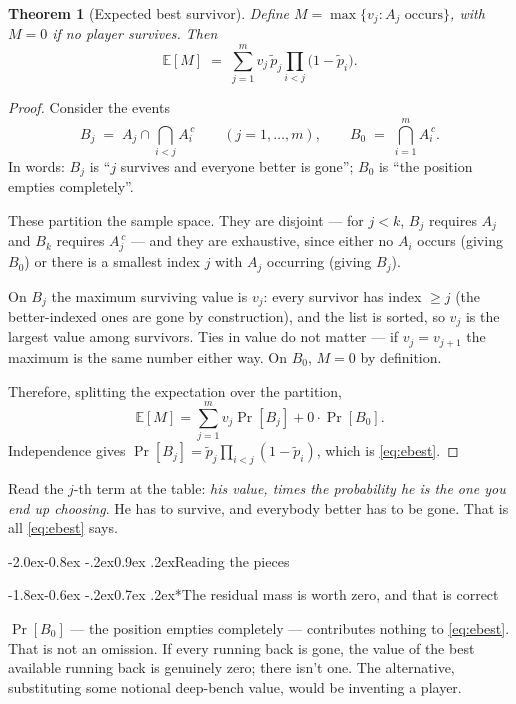 \documentclass[10pt,a4paper]{article}
\makeatletter
\theoremstyle{plain}
\newtheorem{theorem}{Theorem}[section]
\theoremstyle{definition}
\theoremstyle{remark}
\renewcommand\subsection{\@startsection{subsection}{2}{\z@}%
  {-2.0ex\@plus -0.8ex \@minus -.2ex}{0.9ex \@plus .2ex}{\normalfont\large\bfseries}}
\renewcommand\subsubsection{\@startsection{subsubsection}{3}{\z@}%
  {-1.8ex\@plus -0.6ex \@minus -.2ex}{0.7ex \@plus .2ex}{\normalfont\normalsize\bfseries}}
\makeatother
\begin{document}
\begin{theorem}[Expected best survivor]
\label{thm:ebest}
Define $M = \max\{v_j : A_j \text{ occurs}\}$, with $M = 0$ if no player survives. Then
\begin{equation}
\mathbb{E}[M] \;=\; \sum_{j=1}^{m} v_j\, \tilde p_j \prod_{i<j}\big(1 - \tilde p_i\big).
\label{eq:ebest}
\end{equation}
\end{theorem}

\begin{proof}
Consider the events
\[
B_j \;=\; A_j \cap \bigcap_{i<j} A_i^{\,c}
\qquad (j = 1,\dots,m),
\qquad
B_0 \;=\; \bigcap_{i=1}^{m} A_i^{\,c}.
\]
In words: $B_j$ is ``$j$ survives and everyone better is gone''; $B_0$ is ``the position
empties completely''.

These partition the sample space. They are disjoint --- for $j < k$, $B_j$ requires
$A_j$ and $B_k$ requires $A_j^{\,c}$ --- and they are exhaustive, since either no $A_i$
occurs (giving $B_0$) or there is a smallest index $j$ with $A_j$ occurring (giving
$B_j$).

On $B_j$ the maximum surviving value is $v_j$: every survivor has index $\ge j$ (the
better-indexed ones are gone by construction), and the list is sorted, so $v_j$ is the
largest value among survivors. Ties in value do not matter --- if $v_j = v_{j+1}$ the
maximum is the same number either way. On $B_0$, $M = 0$ by definition.

Therefore, splitting the expectation over the partition,
\[
\mathbb{E}[M] = \sum_{j=1}^{m} v_j \Pr[B_j] + 0\cdot\Pr[B_0].
\]
Independence gives $\Pr[B_j] = \tilde p_j \prod_{i<j}(1-\tilde p_i)$, which is
\eqref{eq:ebest}.
\end{proof}

Read the $j$-th term at the table: \emph{his value, times the probability he is the one
you end up choosing}. He has to survive, and everybody better has to be gone. That is
all \eqref{eq:ebest} says.

\subsection{Reading the pieces}

\subsubsection*{The residual mass is worth zero, and that is correct}

$\Pr[B_0]$ --- the position empties completely --- contributes nothing to
\eqref{eq:ebest}. That is not an omission. If every running back is gone, the value of
the best available running back is genuinely zero; there isn't one. The alternative,
substituting some notional deep-bench value, would be inventing a player.
\end{document}
